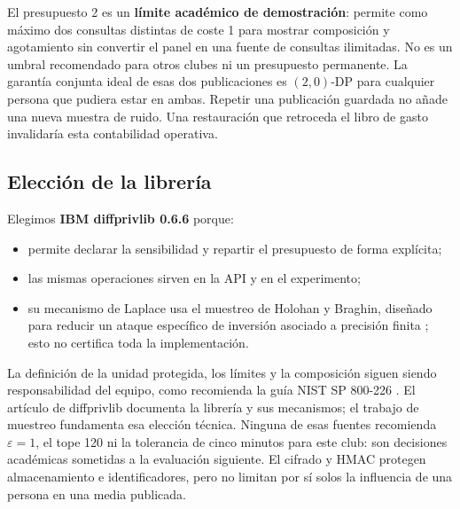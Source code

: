 \documentclass[11pt]{article}
\begin{document}
El presupuesto 2 es un \textbf{límite académico de demostración}: permite como máximo dos consultas distintas de coste 1 para mostrar composición y agotamiento sin convertir el panel en una fuente de consultas ilimitadas. No es un umbral recomendado para otros clubes ni un presupuesto permanente. La garantía conjunta ideal de esas dos publicaciones es $(2,0)$-DP para cualquier persona que pudiera estar en ambas. Repetir una publicación guardada no añade una nueva muestra de ruido. Una restauración que retroceda el libro de gasto invalidaría esta contabilidad operativa.

\subsection{Elección de la librería}
Elegimos \textbf{IBM diffprivlib 0.6.6} \cite{holohan2019} porque:
\begin{itemize}[nosep]
  \item permite declarar la sensibilidad y repartir el presupuesto de forma explícita;
  \item las mismas operaciones sirven en la API y en el experimento;
  \item su mecanismo de Laplace usa el muestreo de Holohan y Braghin, diseñado para reducir un ataque específico de inversión asociado a precisión finita \cite{holohan2021}; esto no certifica toda la implementación.
\end{itemize}
La definición de la unidad protegida, los límites y la composición siguen siendo responsabilidad del equipo, como recomienda la guía NIST SP 800-226 \cite{nist800226}.
El artículo de diffprivlib documenta la librería y sus mecanismos; el trabajo de muestreo fundamenta esa elección técnica. Ninguna de esas fuentes recomienda $\varepsilon=1$, el tope 120 ni la tolerancia de cinco minutos para este club: son decisiones académicas sometidas a la evaluación siguiente. El cifrado y HMAC protegen almacenamiento e identificadores, pero no limitan por sí solos la influencia de una persona en una media publicada.
\end{document}
